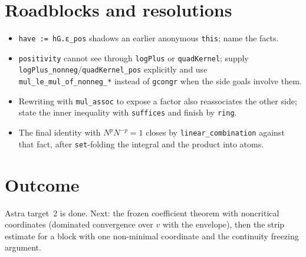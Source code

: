 \documentclass[11pt]{article}
\begin{document}
\section{Roadblocks and resolutions}
\begin{itemize}
\item \texttt{have := hG.ε\_pos} shadows an earlier anonymous \texttt{this}; name the facts.
\item \texttt{positivity} cannot see through \texttt{logPlus} or \texttt{quadKernel}; supply
\texttt{logPlus\_nonneg}/\texttt{quadKernel\_pos} explicitly and use
\texttt{mul\_le\_mul\_of\_nonneg\_*} instead of \texttt{gcongr} when the side goals involve them.
\item Rewriting with \texttt{mul\_assoc} to expose a factor also reassociates the other side; state the
inner inequality with \texttt{suffices} and finish by \texttt{ring}.
\item The final identity with $N^p N^{-p}=1$ closes by \texttt{linear\_combination} against that fact,
after \texttt{set}-folding the integral and the product into atoms.
\end{itemize}

\section{Outcome}
Astra target~2 is done. Next: the frozen coefficient theorem with noncritical coordinates
(dominated convergence over $v$ with the envelope), then the strip estimate for a block with one
non-minimal coordinate and the continuity freezing argument.
\end{document}
